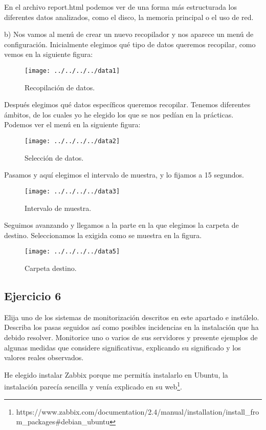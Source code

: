 \documentclass[a4paper, 11pt]{article} %
\begin{document}
En el archivo report.html podemos ver de una forma más estructurada los diferentes datos analizados, como el disco, la memoria principal o el uso de red. 

b) Nos vamos al menú de crear un nuevo recopilador y nos aparece un menú de configuración. Inicialmente elegimos qué tipo de datos queremos recopilar, como vemos en la siguiente figura: 

\begin{figure}[htpb]
\centering
\texttt{[image: ../../../../data1]}
\caption{Recopilación de datos.}
\end{figure}

Después elegimos qué datos específicos queremos recopilar. Tenemos diferentes ámbitos, de los cuales yo he elegido los que se nos pedían en la prácticas. Podemos ver el menú en la siguiente figura: 

\begin{figure}[htpb]
\centering
\texttt{[image: ../../../../data2]}
\caption{Selección de datos.}
\end{figure}

Pasamos y aquí elegimos el intervalo de muestra, y lo fijamos a 15 segundos. 

\begin{figure}[htpb]
\centering
\texttt{[image: ../../../../data3]}
\caption{Intervalo de muestra.}
\end{figure}

Seguimos avanzando y llegamos a la parte en la que elegimos la carpeta de destino. Seleccionamos la exigida como se muestra en la figura. 

\begin{figure}[htpb]
\centering
\texttt{[image: ../../../../data5]}
\caption{Carpeta destino.}
\end{figure}

\subsection{Ejercicio 6}
Elija uno de los sistemas de monitorización descritos en este apartado e instálelo. Describa los pasas seguidos así como posibles incidencias en la instalación que ha debido resolver. Monitorice uno o varios de sus servidores y presente ejemplos de algunas medidas que considere significativas, explicando su significado y los valores reales observados.

He elegido instalar Zabbix porque me permitía instalarlo en Ubuntu, la instalación parecía sencilla y venía explicado en su web\footnote{https://www.zabbix.com/documentation/2.4/manual/installation/install\_from\_packages#debian\_ubuntu}. 
\end{document}
